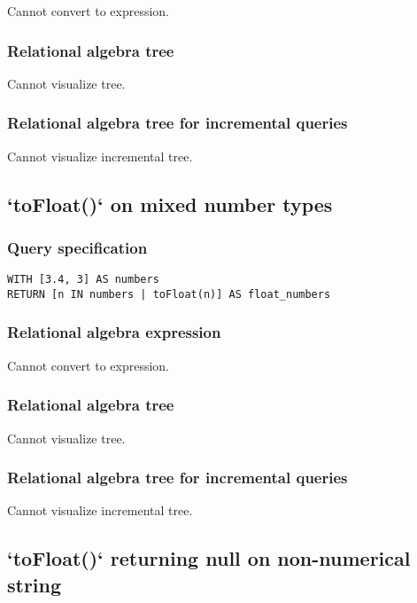 Cannot convert to expression.

\subsubsection*{Relational algebra tree}

Cannot visualize tree.

\subsubsection*{Relational algebra tree for incremental queries}

Cannot visualize incremental tree.

\subsection{`toFloat()` on mixed number types}

\subsubsection*{Query specification}

\begin{lstlisting}
WITH [3.4, 3] AS numbers
RETURN [n IN numbers | toFloat(n)] AS float_numbers
\end{lstlisting}

\subsubsection*{Relational algebra expression}

Cannot convert to expression.

\subsubsection*{Relational algebra tree}

Cannot visualize tree.

\subsubsection*{Relational algebra tree for incremental queries}

Cannot visualize incremental tree.

\subsection{`toFloat()` returning null on non-numerical string}

